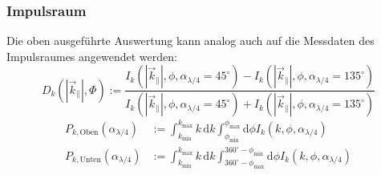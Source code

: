 \documentclass[a4paper, titlepage,  ngerman, fullpage]{book}
\begin{document}
		\subsubsection{Impulsraum}
		Die oben ausgeführte Auswertung kann analog auch auf die Messdaten des Impulsraumes angewendet werden:
		\begin{equation}
			\label{eq:diff_measure_momentum}
			D_k\left(|\vec{k}_\parallel|, \Phi\right) := \dfrac{I_k(|\vec{k}_\parallel|, \phi, \alpha_{\lambda /4} = 45^\circ) - I_k(|\vec{k}_\parallel|, \phi, \alpha_{\lambda /4} = 135^\circ)}{I_k(|\vec{k}_\parallel|, \phi, \alpha_{\lambda /4} = 45^\circ) + I_k(|\vec{k}_\parallel|, \phi, \alpha_{\lambda /4} = 135^\circ)}
		\end{equation} 
		\begin{align}
			P_{k, \mathrm{Oben}}(\alpha_{\lambda/4}) &:= \int_{k_\mathrm{min}}^{k_\mathrm{max}}k \, \mathrm{d}k \int_{\phi_\mathrm{min}}^{\phi_\mathrm{max}} \mathrm{d}\phi I_k(k, \phi, \alpha_{\lambda /4}) \\
			\nonumber
			P_{k, \mathrm{Unten}}(\alpha_{\lambda/4}) &:= \int_{k_\mathrm{min}}^{k_\mathrm{max}}k \, \mathrm{d}k \int_{360^\circ -\phi_\mathrm{max}}^{360^\circ - \phi_\mathrm{min}} \mathrm{d}\phi I_k(k, \phi, \alpha_{\lambda/4})		 	
		\end{align}
		
\end{document}
